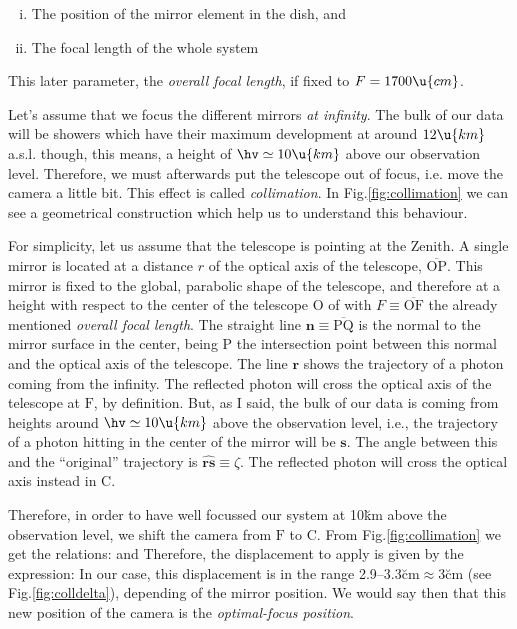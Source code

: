 \begin{enumerate}[i.]
\item The position of the mirror element in the dish, and
\item The focal length of the whole system
\end{enumerate}

This later parameter, the \emph{overall focal length}, if fixed to
$F=1700\u{cm}$. 

Let's assume that we focus the different mirrors \emph{at infinity}.
The bulk of our data will be showers which have their maximum
development at around $12\u{km}$ a.s.l. though, this means, a height
of $\hv\simeq 10\u{km}$ above our observation level.  Therefore, we
must afterwards put the telescope out of focus, i.e. move the camera a
little bit. This effect is called \emph{collimation}. In
Fig.\ref{fig:collimation} we can see a geometrical construction which
help us to understand this behaviour.  

For simplicity, let us assume that the telescope is pointing at the
Zenith. A single mirror is located at a distance $r$ of the optical
axis of the telescope, $\overline{\mathrm{OP}}$. This mirror is fixed
to the global, parabolic shape of the telescope, and therefore at a
height with respect to the center of the telescope $\mathrm{O}$ of
%
\zparabeq
%
with $F\equiv\overline{\mathrm{OF}}$ the already mentioned
\emph{overall focal length}. The straight line
$\mathbf{n}\equiv\overline{\mathrm{PQ}}$ is the normal to the mirror
surface in the center, being $\mathrm{P}$ the intersection point
between this normal and the optical axis of the telescope. The line
$\mathbf{r}$ shows the trajectory of a photon coming from the
infinity. The reflected photon will cross the optical axis of the
telescope at $\mathrm{F}$, by definition. But, as I said, the bulk of
our data is coming from heights around $\hv\simeq 10\u{km}$ above the
observation level, i.e., the trajectory of a photon hitting in the
center of the mirror will be $\mathbf{s}$. The angle between this and
the ``original'' trajectory is $\widehat{\mathbf{rs}}\equiv\zeta$. The
reflected photon will cross the optical axis instead in $\mathrm{C}$.

Therefore, in order to have well focussed our system at 10\u{km} above
the observation level, we shift the camera from $\mathrm{F}$ to
$\mathrm{C}$. From Fig.\ref{fig:collimation} we get the relations:
%
\relationsAeq
%
and
%
\relationsBeq
%
Therefore, the displacement to apply is given by the expression:
%
\collimationeq
%
In our case, this displacement is in the range
2.9--3.3\u{cm}$\approx$3\u{cm} (see Fig.\ref{fig:colldelta}),
depending of the mirror position. We would say then that this new
position of the camera is the \emph{optimal-focus position}.

